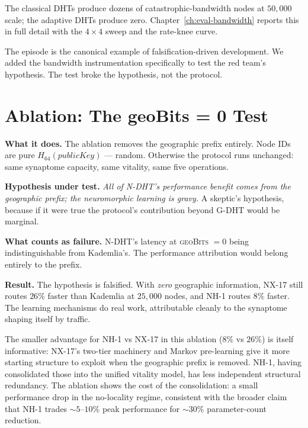 \documentclass[twoside,nobib]{tufte-book}
\newcommand{\NDHT}{N-DHT\xspace}
\newcommand{\GDHT}{G-DHT\xspace}
\begin{document}
The classical DHTs produce dozens of catastrophic-bandwidth
nodes at $50{,}000$ scale; the adaptive DHTs produce zero.
Chapter~\ref{ch:eval-bandwidth} reports this in full detail
with the $4 \times 4$ sweep and the rate-knee curve.

The episode is the canonical example of falsification-driven
development. We added the bandwidth instrumentation
specifically to test the red team's hypothesis. The test broke
the hypothesis, not the protocol.

\section{Ablation: The geoBits = 0 Test}

\textbf{What it does.} The ablation removes the geographic
prefix entirely. Node IDs are pure $H_{64}(\mathit{publicKey})$
--- random. Otherwise the protocol runs unchanged: same
synaptome capacity, same vitality, same five operations.

\textbf{Hypothesis under test.} \emph{All of \NDHT's
performance benefit comes from the geographic prefix; the
neuromorphic learning is gravy.} A skeptic's hypothesis,
because if it were true the protocol's contribution beyond
\GDHT would be marginal.

\textbf{What counts as failure.} \NDHT's latency at
\textsc{geoBits} $= 0$ being indistinguishable from Kademlia's.
The performance attribution would belong entirely to the
prefix.

\textbf{Result.} The hypothesis is falsified. With \emph{zero}
geographic information, NX-17 still routes $26\%$ faster than
Kademlia at $25{,}000$ nodes, and NH-1 routes $8\%$ faster. The
learning mechanisms do real work, attributable cleanly to the
synaptome shaping itself by traffic.

The smaller advantage for NH-1 vs NX-17 in this ablation
($8\%$ vs $26\%$) is itself informative: NX-17's two-tier
machinery and Markov pre-learning give it more starting
structure to exploit when the geographic prefix is removed.
NH-1, having consolidated those into the unified vitality
model, has less independent structural redundancy. The
ablation shows the cost of the consolidation: a small
performance drop in the no-locality regime, consistent with
the broader claim that NH-1 trades $\sim 5$--$10\%$ peak
performance for $\sim 30\%$ parameter-count reduction.
\end{document}
